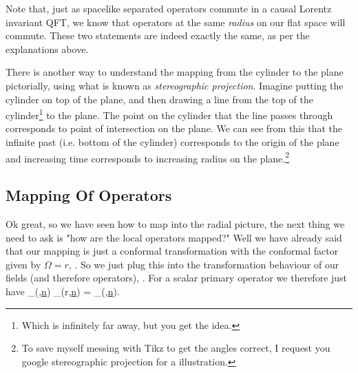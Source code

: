 \badr 
    Note that, just as spacelike separated operators commute in a causal Lorentz invariant QFT, we know that operators at the same \textit{radius} on our flat space will commute. These two statements are indeed exactly the same, as per the explanations above.
\eadr 

\badr 
    There is another way to understand the mapping from the cylinder to the plane pictorially, using what is known as \textit{stereographic projection}. Imagine putting the cylinder on top of the plane, and then drawing a line from the top of the cylinder\footnote{Which is infinitely far away, but you get the idea.} to the plane. The point on the cylinder that the line passes through corresponds to point of intersection on the plane. We can see from this that the infinite past (i.e. bottom of the cylinder) corresponds to the origin of the plane and increasing time corresponds to increasing radius on the plane.\footnote{To save myself messing with Tikz to get the angles correct, I request you google stereographic projection for a illustration.}
\eadr 

\subsection{Mapping Of Operators}

Ok great, so we have seen how to map into the radial picture, the next thing we need to ask is "how are the local operators mapped?" Well we have already said that our mapping is just a conformal transformation with the conformal factor given by $\Omega = r$, . So we just plug this into the transformation behaviour of our fields (and therefore operators), . For a scalar primary operator we therefore just have 
\bse 
    \cO_{}(\tau,\underline{n}) \to \cO_{}(r,\underline{n}) =  \cO_{}(\tau,\underline{n}).
\ese 

